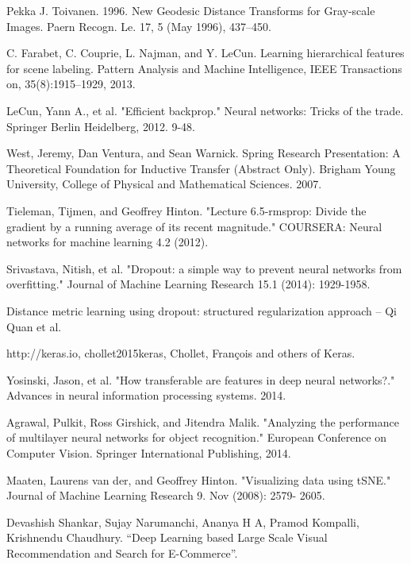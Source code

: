 \documentclass[10pt,twocolumn,letterpaper]{article}
\begin{document}
{\begin{thebibliography}{10}
Pekka J. Toivanen. 1996. 
\newblock New Geodesic Distance Transforms for Gray-scale Images. Paern Recogn. Le. 17, 5 (May 1996), 437–450.

C. Farabet, C. Couprie, L. Najman, and Y. LeCun. 
\newblock Learning hierarchical features for scene labeling. Pattern Analysis and Machine Intelligence, 
\newblock IEEE Transactions on, 35(8):1915–1929, 2013.

LeCun, Yann A., et al. "Efficient backprop." 
\newblock Neural networks: Tricks of the trade. Springer Berlin Heidelberg, 2012. 9-48.

West, Jeremy, Dan Ventura, and Sean Warnick. 
\newblock Spring Research Presentation: A Theoretical Foundation for Inductive Transfer (Abstract Only). 
\newblock Brigham Young University, College of Physical and Mathematical Sciences. 2007.

Tieleman, Tijmen, and Geoffrey Hinton. 
\newblock "Lecture 6.5-rmsprop: Divide the gradient by a running average of its recent magnitude." COURSERA: Neural networks for machine learning 4.2 (2012).

Srivastava, Nitish, et al. 
\newblock "Dropout: a simple way to prevent neural networks from overfitting." 
\newblock Journal of Machine Learning Research 15.1 (2014): 1929-1958.

Distance metric learning using dropout: structured regularization approach – Qi Quan et al.

http://keras.io, chollet2015keras, Chollet, Fran\c{c}ois and others of Keras.

Yosinski, Jason, et al. "How transferable are features in deep neural networks?." 
\newblock Advances in neural information processing systems. 2014. 

Agrawal, Pulkit, Ross Girshick, and Jitendra Malik. 
\newblock "Analyzing the performance of multilayer neural networks for object recognition." 
\newblock European Conference on Computer Vision. Springer International Publishing, 2014.

Maaten, Laurens van der, and Geoffrey Hinton. 
\newblock "Visualizing data using tSNE."
\newblock Journal of Machine Learning Research 9. Nov (2008): 2579- 2605.

Devashish Shankar, Sujay Narumanchi, Ananya H A, Pramod Kompalli, Krishnendu Chaudhury. 
\newblock “Deep Learning based Large Scale Visual Recommendation and Search for E-Commerce”.


\end{thebibliography}}
\end{document}
